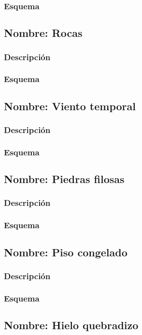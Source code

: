 \documentclass[11pt,letterpaper]{article}
\begin{document}
	\subsubsection{Esquema}
		\subsection{Nombre: Rocas}
	\subsubsection{Descripción}
	\subsubsection{Esquema}
		\subsection{Nombre: Viento temporal}
	\subsubsection{Descripción}
	\subsubsection{Esquema}
		\subsection{Nombre: Piedras filosas}
	\subsubsection{Descripción}
	\subsubsection{Esquema}
		\subsection{Nombre: Piso congelado}
	\subsubsection{Descripción}
	\subsubsection{Esquema}
		\subsection{Nombre: Hielo quebradizo}
\end{document}

